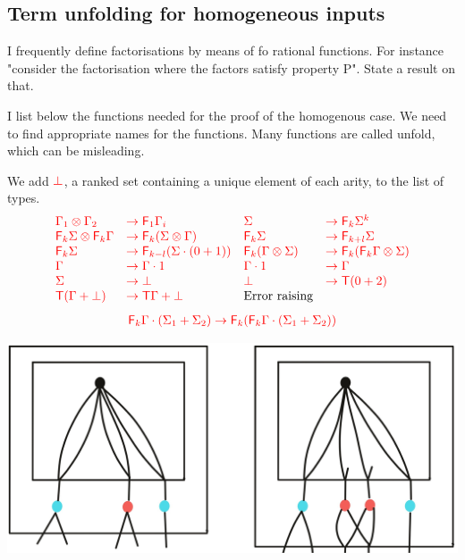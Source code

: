 
\subsection{Term unfolding for homogeneous inputs}
\label{sec:homo-unfold}


I frequently define factorisations by means of fo rational functions. For instance "consider the factorisation where the factors satisfy property P". State a result on that.


I list below the functions needed for the proof of the homogenous case. We need to find appropriate names for the functions. Many functions are called unfold, which can be misleading.

We add ${\color{red}{\bot}}$, a ranked set containing a unique element of each arity, to the list of types. 
$$
\begin{array}{llll}
{\color{red}{\Gamma_1\otimes\Gamma_2}} &{\color{red}{\to {\color{red}{\mathsf F_{1}}}\Gamma_i}}&
{\color{red}{\Sigma}}&{\color{red}{\to {\color{red}{\mathsf F_{k}}}\Sigma^k}}\\
{\color{red}{{\color{red}{\mathsf F_{k}}}\Sigma \otimes {\color{red}{\mathsf F_{k}}}\Gamma }}&{\color{red}{\to {\color{red}{\mathsf F_{k}}}(\Sigma\otimes \Gamma)}}&
{\color{red}{{\color{red}{\mathsf F_{k}}}\Sigma }}&{\color{red}{\to {\color{red}{\mathsf F_{k+l}}}\Sigma }}\\
{\color{red}{{\color{red}{\mathsf F_{k}}}\Sigma }}&{\color{red}{\to {\color{red}{\mathsf F_{k-l}}}(\Sigma\cdot(0+1))}}&
{\color{red}{{\color{red}{\mathsf F_{k}}}(\Gamma\otimes \Sigma) }}&{\color{red}{\to {\color{red}{\mathsf F_{k}}}({\color{red}{\mathsf F_{k}}}\Gamma \otimes \Sigma)}}\\
{\color{red}{\Gamma }}&{\color{red}{\to \Gamma\cdot 1}}& {\color{red}{\Gamma\cdot 1 }}&{\color{red}{\to \Gamma}}\\
{\color{red}{\Sigma}}&{\color{red}{\to\bot}}&
{\color{red}{\bot }}&{\color{red}{\to {\color{red}{\mathsf T}}(0+2)}}\\
{\color{red}{{\color{red}{\mathsf T}}(\Gamma+\bot)}}&{\color{red}{\to {\color{red}{\mathsf T}}\Gamma+\bot}} & \text{Error raising}
\end{array}$$
\begin{align*}
{\color{red}{{\color{red}{\mathsf F_{k}}}\Gamma\cdot(\Sigma_1+\Sigma_2)\to {\color{red}{\mathsf F_{k}}}({\color{red}{\mathsf F_{k}}}\Gamma\cdot(\Sigma_1+\Sigma_2))}}
\end{align*}
\begin{center}
\includegraphics[scale=.05]{MyPicBasicFun1.jpg}
\end{center}

